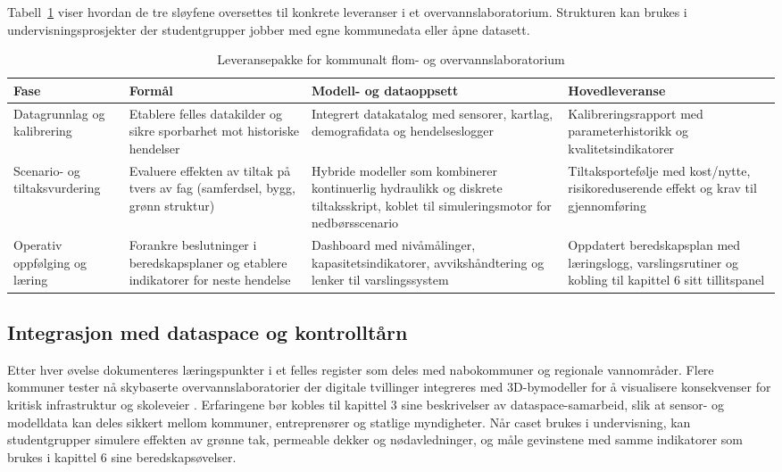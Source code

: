 Tabell~\ref{tab:overvanns-lab} viser hvordan de tre sløyfene oversettes til konkrete leveranser i et overvannslaboratorium. Strukturen kan brukes i undervisningsprosjekter der studentgrupper jobber med egne kommunedata eller åpne datasett.

\begin{table}[ht]
    \centering
    \caption{Leveransepakke for kommunalt flom- og overvannslaboratorium}
    \label{tab:overvanns-lab}
    \begin{tabular}{|p{3.1cm}|p{4.4cm}|p{4.4cm}|p{3.1cm}|}
        \hline
        \textbf{Fase} & \textbf{Formål} & \textbf{Modell- og dataoppsett} & \textbf{Hovedleveranse} \\
        \hline
        Datagrunnlag og kalibrering & Etablere felles datakilder og sikre sporbarhet mot historiske hendelser & Integrert datakatalog med sensorer, kartlag, demografidata og hendelseslogger \citep{nve2022kommunal} & Kalibreringsrapport med parameterhistorikk og kvalitetsindikatorer \\
        \hline
        Scenario- og tiltaksvurdering & Evaluere effekten av tiltak på tvers av fag (samferdsel, bygg, grønn struktur) & Hybride modeller som kombinerer kontinuerlig hydraulikk og diskrete tiltaksskript, koblet til simuleringsmotor for nedbørsscenario & Tiltaksportefølje med kost/nytte, risikoreduserende effekt og krav til gjennomføring \citep{dsb2022beredskap} \\
        \hline
        Operativ oppfølging og læring & Forankre beslutninger i beredskapsplaner og etablere indikatorer for neste hendelse & Dashboard med nivåmålinger, kapasitetsindikatorer, avvikshåndtering og lenker til varslingssystem \citep{oslo2023overvann} & Oppdatert beredskapsplan med læringslogg, varslingsrutiner og kobling til kapittel 6 sitt tillitspanel \\
        \hline
    \end{tabular}
\end{table}

\subsection{Integrasjon med dataspace og kontrolltårn}
Etter hver øvelse dokumenteres læringspunkter i et felles register som deles med nabokommuner og regionale vannområder. Flere kommuner tester nå skybaserte overvannslaboratorier der digitale tvillinger integreres med 3D-bymodeller for å visualisere konsekvenser for kritisk infrastruktur og skoleveier \citep{asplan2023overvannslab}. Erfaringene bør kobles til kapittel 3 sine beskrivelser av dataspace-samarbeid, slik at sensor- og modelldata kan deles sikkert mellom kommuner, entreprenører og statlige myndigheter. Når caset brukes i undervisning, kan studentgrupper simulere effekten av grønne tak, permeable dekker og nødavledninger, og måle gevinstene med samme indikatorer som brukes i kapittel 6 sine beredskapsøvelser.

